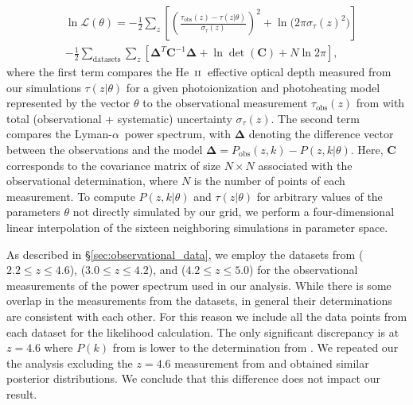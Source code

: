 \documentclass[twocolumn]{aastex62}
\newcommand\Lya{Lyman-$\alpha$}
\def\HeII{\hbox{He~$\scriptstyle\rm II$}}
\begin{document}
\begin{equation}
\begin{aligned}
& \ln \mathcal{L}(\theta) =  
- \frac{1}{2} \sum_z \left[ \left( \frac{  \tau_{\mathrm{obs}}(z) - \tau(z|\theta) }{ \sigma_\tau(z)  } \right) ^2 + \ln \big( 2\pi \sigma_\tau(z)^2 \big)  \right] \\
& - \frac{1}{2}  \sum_\mathrm{datasets} \sum_z \left[  \mathbf{\Delta}^{T} \mathbf{C}^{-1} \mathbf{\Delta} +  \ln \operatorname{det}(\mathbf{C}) + N \ln 2 \pi  \right],
\end{aligned}
\label{eq:mcmc_likelihood}
\end{equation}
\noindent
where the first term compares the \HeII\ effective optical depth measured from our simulations  $\tau(z|\theta)$ 
for a given photoionization and photoheating model represented by the vector $\theta$ to the observational measurement $ \tau_{\mathrm{obs}}(z)$ 
from \cite{Worseck+2019} with total (observational + systematic) uncertainty $\sigma_\tau(z)$.  The second term compares the \Lya\ power 
spectrum, with $\mathbf{\Delta}$ denoting the difference vector between the observations and the model 
$\mathbf{\Delta} = P_{\mathrm{obs}}(z,k) - P(z,k|\theta)$. Here, $\mathbf{C }$ corresponds to the covariance matrix of size 
$N \times N$ associated with the observational determination, where $N$ is the number of points of each measurement. 
To compute $P(z,k|\theta)$ and $\tau(z|\theta)$ for arbitrary values of the parameters $\theta$ not directly
simulated by our grid, we perform a four-dimensional linear interpolation of the sixteen neighboring simulations in parameter space.

 
As described in \S\ref{sec:observational_data}, we employ the datasets from \cite{Chabanier+2019} ($2.2 \leq z \leq 4.6$),  
\cite{Irsic+2017a} ($3.0 \leq z \leq 4.2$),
and \cite{boera2019a} ($4.2 \leq z \leq 5.0$)  for the observational measurements of the power spectrum used in our analysis.
While there is some overlap in the measurements from the datasets,  in general their determinations are consistent with each other.
For this reason we include all the data points 
from each dataset for the likelihood calculation.  The only significant discrepancy is at $z=4.6$ where $P(k)$ from \cite{Chabanier+2019} is lower 
to the determination from \cite{boera2019a}. We repeated our the analysis excluding the $z=4.6$ measurement from \cite{Chabanier+2019} and 
obtained similar posterior distributions. We conclude that this difference does not impact our result. 
\end{document}
